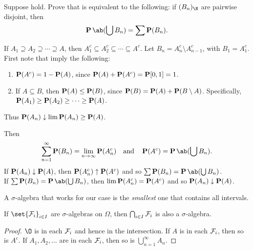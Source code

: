 \begin{exercise} \label{thm:needs-and-desires}
    Suppose  hold.
    Prove that 
    is equivalent to the following:
    if $(B_n)_\N$ are pairwise disjoint, then \begin{equation}
        \P\ab(\bigcup B_n) = \sum \P(B_n). \label{eq:disjoint-union}
    \end{equation}
\end{exercise}
\begin{solution}
    If $A_1 \supseteq A_2 \supseteq \cdots \supseteq A$, then
    $A_1^c \subseteq A_2^c \subseteq \cdots \subseteq A^c$.
    Let $B_n = A_n^c \setminus A_{n-1}^c$, with $B_1 = A_1^c$.
    First note that 
    imply the following:
    \begin{enumerate}
        \item $\P(A^c) = 1 - \P(A)$, since $\P(A) + \P(A^c) = \P[0, 1] = 1$.
        \item If $A \subseteq B$, then $\P(A) \le \P(B)$,
            since $\P(B) = \P(A) + \P(B \setminus A)$.
            Specifically, $\P(A_1) \ge \P(A_2) \ge \cdots \ge \P(A)$.
    \end{enumerate}
    Thus $\P(A_n) \downto \lim \P(A_n) \ge \P(A)$.

    Then \[
        \sum_{n=1}^\infty \P(B_n) = \lim_{n \to \infty} \P(A_n^c)
        \quad\text{and}\quad
        \P(A^c) = \P\ab(\bigcup B_n).
    \] If $\P(A_n) \downto \P(A)$, then $\P(A_n^c) \upto \P(A^c)$ and
    so $\sum \P(B_n) = \P\ab(\bigcup B_n)$. \\
    If $\sum \P(B_n) = \P\ab(\bigcup B_n)$, then $\lim \P(A_n^c) = \P(A^c)$
    and so $\P(A_n) \downto \P(A)$.
\end{solution}

A $\sigma$-algebra that works for our case is the \emph{smallest}
one that contains all intervals.

\begin{exercise}
    If $\set{\F_i}_{i \in I}$ are $\sigma$-algebras on $\Omega$, then
    $\bigcap_{i \in I} \F_i$ is also a $\sigma$-algebra.
\end{exercise}
\begin{proof}
    $\O$ is in each $\F_i$ and hence in the intersection.
    If $A$ is in each $\F_i$, then so is $A^c$.
    If $A_1, A_2, \ldots$ are in each $\F_i$, then so is
    $\bigcup_{n=1}^\infty A_n$.
\end{proof}

